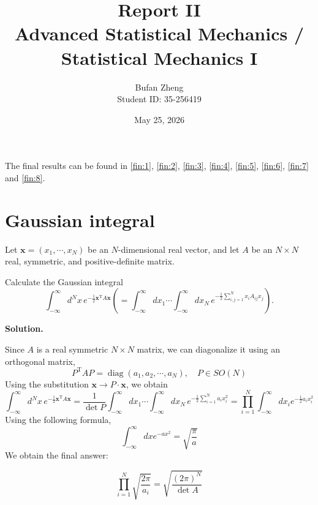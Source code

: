 \documentclass[11pt,a4paper]{article}
\title{\textbf{Report II}\\[0.4em]
	\large Advanced Statistical Mechanics / Statistical Mechanics I}
\author{Bufan Zheng\\[0.2em]\normalsize Student ID: 35-256419}
\date{May 25, 2026}
\newcounter{problem}
\newcounter{saveequation}
\newenvironment{solution}
{
	\par
	\setcounter{saveequation}{\value{equation}}
	\begingroup
	\setcounter{equation}{0}
	\renewcommand{\theequation}{\arabic{problem}.\arabic{equation}}
	\renewcommand{\theHequation}{sol.\arabic{problem}.\arabic{equation}}
	\noindent\textbf{Solution.}\quad
}
{
	\par
	\endgroup
	\setcounter{equation}{\value{saveequation}}
}
\begin{document}
	
	\maketitle
	
	The final results can be found in \eqref{fin:1}, \eqref{fin:2}, \eqref{fin:3}, \eqref{fin:4}, \eqref{fin:5}, \eqref{fin:6}, \eqref{fin:7} and \eqref{fin:8}.
	
	\section{Gaussian integral}
	
	Let $\boldsymbol{x} = (x_1,\cdots,x_N)$ be an $N$-dimensional real vector, and let $A$ be an $N\times N$ real, symmetric, and positive-definite matrix.
	
	\begin{problembox}
		Calculate the Gaussian integral
		\begin{equation}
			\int_{-\infty}^{\infty} d^N x\, e^{-\frac{1}{2}\boldsymbol{x}^{\mathrm{T}}A\boldsymbol{x}}
			\left(=
			\int_{-\infty}^{\infty} dx_1\cdots\int_{-\infty}^{\infty} dx_N\,
			e^{-\frac{1}{2}\sum_{i,j=1}^{N}x_iA_{ij}x_j}
			\right).
		\end{equation}
	\end{problembox}
	\begin{solution}
		Since $A$ is a real symmetric $N\times N$ matrix, we can diagonalize it using an orthogonal matrix,
		\begin{equation}
			P^\mathrm{T} A P = \operatorname{diag}(a_1,a_2,\cdots,a_N),\quad P\in SO(N)
		\end{equation}
		Using the substitution $\mathbf{x}\to P\cdot\mathbf{x}$, we obtain
		\begin{equation}
				\int_{-\infty}^{\infty} d^N x\, e^{-\frac{1}{2}\boldsymbol{x}^{\mathrm{T}}A\boldsymbol{x}}
				=
				\frac{1}{\det P}
				\int_{-\infty}^{\infty} dx_1\cdots\int_{-\infty}^{\infty} dx_N\,
				e^{-\frac{1}{2}\sum_{i=1}^{N}a_i x_i^2}=\prod_{i=1}^{N}\int_{-\infty}^{\infty} dx_i e^{-\frac12 a_i x_i^2}
		\end{equation}
		Using the following formula,
		\begin{equation}
			\int_{-\infty}^{\infty}dx e^{-ax^2}=\sqrt{\frac\pi a}
		\end{equation}
		We obtain the final answer:
		\begin{finalanswer}
			\begin{equation}
				\label{fin:1}
				\prod_{i=1}^{N}\sqrt{\frac{2\pi}{a_i}}=\sqrt{\frac{(2\pi)^{N}}{\det A}}
			\end{equation}
		\end{finalanswer}
	\end{solution}
	
\end{document}
